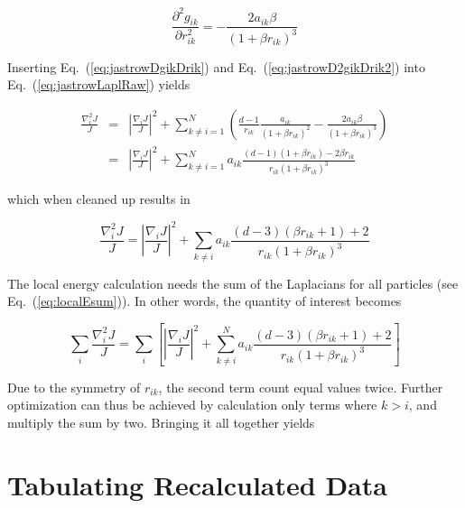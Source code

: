 \begin{equation}
\label{eq:jastrowD2gikDrik2}
 \frac{\partial^2 g_{ik}}{\partial r_{ik}^2} = -\frac{2a_{ik}\beta}{(1 + \beta r_{ik})^3}
\end{equation}

Inserting Eq.~(\ref{eq:jastrowDgikDrik}) and Eq.~(\ref{eq:jastrowD2gikDrik2}) into Eq.~(\ref{eq:jastrowLaplRaw}) yields

\begin{eqnarray}
 \frac{\nabla^2_i J}{J} &=& \left| \frac{\nabla_i J}{J}\right|^2 + \sum_{k \ne i = 1}^N \left(\frac{d-1}{r_{ik}}\frac{a_{ik}}{(1 + \beta r_{ik})^2} - \frac{2a_{ik}\beta}{(1 + \beta r_{ik})^3}\right) \nonumber\\
  &=& \left| \frac{\nabla_i J}{J}\right|^2 + \sum_{k \ne i = 1}^N a_{ik}\frac{(d-1)(1 + \beta r_{ik}) - 2\beta r_{ik}}{r_{ik}(1 + \beta r_{ik})^3} \nonumber
\end{eqnarray}

which when cleaned up results in

\begin{equation}
 \frac{\nabla^2_i J}{J} = \left| \frac{\nabla_i J}{J}\right|^2 + \sum_{k \ne i} a_{ik}\frac{(d-3)(\beta r_{ik} + 1) + 2}{r_{ik}(1 + \beta r_{ik})^3}
\end{equation}

The local energy calculation needs the sum of the Laplacians for all particles (see Eq.~(\ref{eq:localEsum})). In other words, the quantity of interest becomes

\begin{equation}
 \sum_i \frac{\nabla^2_i J}{J} = \sum_i \left[\left|\frac{\nabla_i J}{J}\right|^2 + \sum_{k \ne i}^N a_{ik}\frac{(d-3)(\beta r_{ik} + 1) + 2}{r_{ik}(1 + \beta r_{ik})^3}\right]
\end{equation}

Due to the symmetry of $r_{ik}$, the second term count equal values twice. Further optimization can thus be achieved by calculation only terms where $k>i$, and multiply the sum by two. Bringing it all together yields



\section{Tabulating Recalculated Data}

